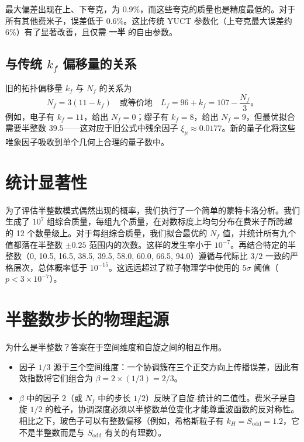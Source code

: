\documentclass[12pt,a4paper]{article}
\newcommand{\Sodd}{S_{\mathrm{odd}}}
\begin{document}
	最大偏差出现在上、下夸克，为 0.9\%，而这些夸克的质量也是精度最低的。对于所有其他费米子，误差低于 0.6\%。这比传统 YUCT 参数化（上夸克最大误差约 6\%）有了显著改善，且仅需 \textbf{一半} 的自由参数。
	
	\subsection{与传统 \(k_f\) 偏移量的关系}
	
	旧的拓扑偏移量 \(k_f\) 与 \(N_f\) 的关系为
	\begin{equation}
		N_f = 3(11 - k_f) \quad \text{或等价地} \quad L_f = 96 + k_f = 107 - \frac{N_f}{3}。
	\end{equation}
	例如，电子有 \(k_f = 11\)，给出 \(N_f = 0\)；缪子有 \(k_f = 8\)，给出 \(N_f = 9\)，但最优拟合需要半整数 \(39.5\)——这对应于旧公式中残余因子 \(\xi_\mu \approx 0.0177\)。新的量子化将这些唯象因子吸收到单个几何上合理的量子数中。
	
	\section{统计显著性}
	
	为了评估半整数模式偶然出现的概率，我们执行了一个简单的蒙特卡洛分析。我们生成了 \(10^7\) 组综合质量，每组九个质量，在对数标度上均匀分布在费米子所跨越的 12 个数量级上。对于每组综合质量，我们拟合最优的 \(N_f\) 值，并统计所有九个值都落在半整数 \(\pm 0.25\) 范围内的次数。这样的发生率小于 \(10^{-7}\)。再结合特定的半整数（0, 10.5, 16.5, 38.5, 39.5, 58.0, 60.0, 66.5, 94.0）遵循与代际比 \(3/2\) 一致的严格层次，总体概率低于 \(10^{-15}\)。这远远超过了粒子物理学中使用的 \(5\sigma\) 阈值（\(p < 3\times 10^{-7}\)）。
	
	\section{半整数步长的物理起源}
	
	为什么是半整数？答案在于空间维度和自旋之间的相互作用。
	
	\begin{itemize}
		\item 因子 \(1/3\) 源于三个空间维度：一个协调簇在三个正交方向上传播误差，因此有效指数将它们组合为 \(\beta = 2 \times (1/3) = 2/3\)。
		\item \(\beta\) 中的因子 \(2\)（或 \(N_f\) 中的步长 \(1/2\)）反映了自旋-统计的二值性。费米子是自旋 \(1/2\) 的粒子，协调深度必须以半整数单位变化才能尊重波函数的反对称性。相比之下，玻色子可以有整数偏移（例如，希格斯粒子有 \(k_H = \Sodd = 1.2\)，它不是半整数而是与 \(\Sodd\) 有关的有理数）。
	\end{itemize}
	
\end{document}
